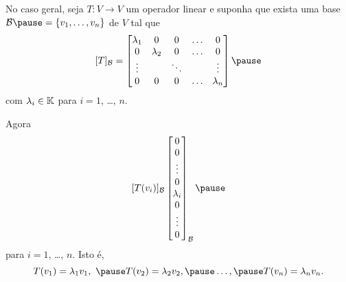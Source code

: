 \documentclass{beamer}
\begin{document}
    \begin{frame}
        No caso geral, \pause seja $T : V \to V$ um operador linear \pause e suponha que exista uma base $\mathcal{B} \pause = \{v_1,\dots,v_n\}$ \pause de $V$ tal que\pause
        \begin{align}\label{formadiagonal}
            [T]_\mathcal{B} = \begin{bmatrix}
                \lambda_1 & 0 & 0 & \dots & 0\\
                0 & \lambda_2 & 0 & \dots & 0\\
                \vdots & & \ddots & & \vdots\\
                0 & 0 & 0 & \dots & \lambda_n
            \end{bmatrix}\pause
        \end{align}
        com $\lambda_i \in \mathbb{K}$ para $i = 1$, \dots, $n$.
    \end{frame}

    \begin{frame}
        Agora\pause
        \[
            [T(v_i)]_\mathcal{B}
            \begin{bmatrix}
            0\\
            0\\
            \vdots\\
            0\\
            \lambda_i\\
            0\\
            \vdots\\
            0
        \end{bmatrix}_\mathcal{B}\pause
        \]
        para $i = 1$, \dots, $n$. \pause Isto é,\pause
        \[
            T(v_1) = \lambda_1 v_1,\ \pause T(v_2) = \lambda_2 v_2,\pause \dots,\pause  T(v_n) = \lambda_n v_n.
        \]
    \end{frame}
\end{document}
